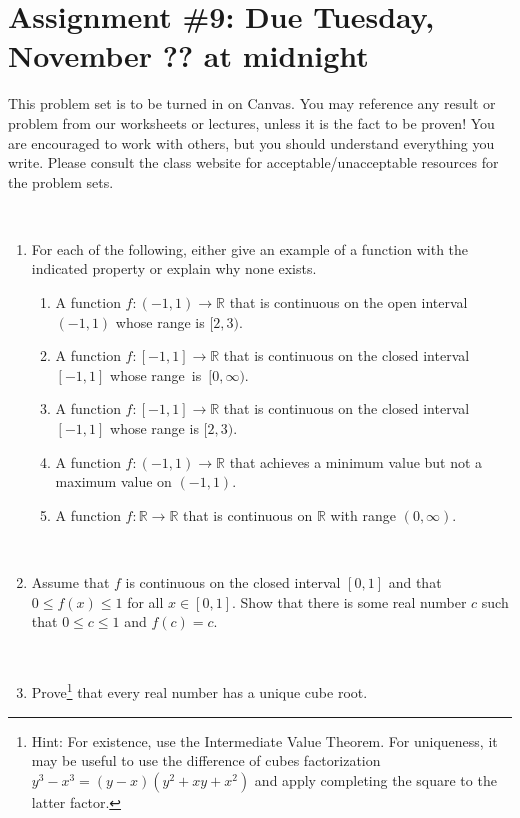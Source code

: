 \documentclass[12pt]{amsart}
\newcommand{\R}{\mathbb{R}}
\newcommand{\showsol}[1]{\def\displaysol{#1}}
\begin{document}
\showsol{1}
	
	\thispagestyle{empty}
	
	\section*{Assignment \#9: Due Tuesday, November ?? at midnight}
	
	This problem set is to be turned in on Canvas. You may reference any result or problem from our worksheets or lectures, unless it is the fact to be proven! You are encouraged to work with others, but you should understand everything you write. Please consult the class website for acceptable/unacceptable resources for the problem sets.
	
	\
	

\begin{enumerate}


\item For each of the following, either give an example of a function with the indicated property or explain why none exists.
\begin{enumerate}
\item A function $f:(-1,1)\to \R$ that is continuous on the open interval $(-1,1)$ whose range is $[2,3)$.
\item A function $f:[-1,1]\to \R$ that is continuous on the closed interval $[-1,1]$ whose range~is~$[0,\infty)$.
\item A function $f:[-1,1]\to \R$ that is continuous on the closed interval $[-1,1]$ whose range is $[2,3)$.
\item A function $f:(-1,1)\to \R$ that achieves a minimum value but not a maximum value on $(-1,1)$.
\item A function $f:\R\to \R$ that is continuous on $\R$ with range $(0,\infty)$.
\end{enumerate}

\

\item Assume that $f$ is continuous on the closed interval $[0,1]$ and that $0\leq f(x) \leq 1$ for all $x\in [0,1]$. Show that there is some real number $c$ such that $0\leq c \leq 1$ and $f(c)=c$.

\


\item Prove\footnote{Hint: For existence, use the Intermediate Value Theorem. For uniqueness, it may be useful to use the difference of cubes factorization $y^3 - x^3  = (y-x)(y^2+xy+x^2)$ and apply completing the square to the latter factor.}  that every real number has a unique cube root.


\end{enumerate}
\end{document}
